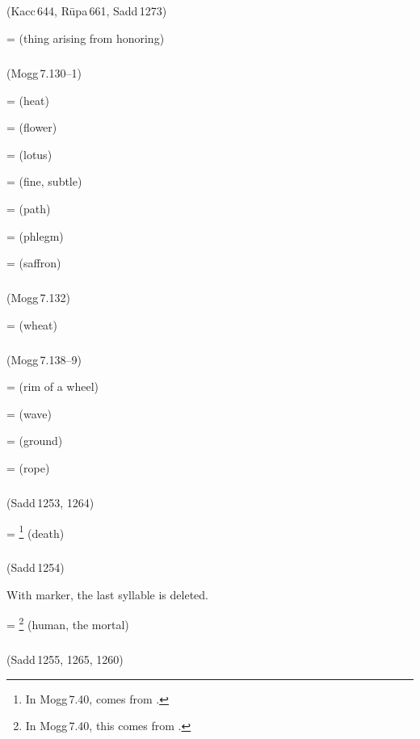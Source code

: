 \subparagraph*{} (Kacc\,644, R\=upa\,661, Sadd\,1273)\label{pacckx:dnima}

 =  (thing arising from honoring)\par

\subparagraph*{} (Mogg\,7.130--1)\label{pacckx:kuma}

 =  (heat)\par
{} =  (flower)\par
{} =  (lotus)\par
{} =  (fine, subtle)\par
{} =  (path)\par
{} =  (phlegm)\par
{} =  (saffron)\par

\subparagraph*{} (Mogg\,7.132)\label{pacckx:uma}

 =  (wheat)\par

\subparagraph*{} (Mogg\,7.138--9)\label{pacckx:mi}

 =  (rim of a wheel)\par
{} =  (wave)\par
{} =  (ground)\par
{} =  (rope)\par

\subparagraph*{} (Sadd\,1253, 1264)\label{pacckx:tyu}\label{pacckx:dtdtu}

 = \footnote{In Mogg\,7.40,  comes from .} (death)\par

\subparagraph*{} (Sadd\,1254)\label{pacckx:ratya}

With  marker, the last syllable is deleted.

 = \footnote{In Mogg\,7.40, this comes from .} (human, the mortal)\par

\subparagraph*{} (Sadd\,1255, 1265, 1260)\label{pacckx:tya}


